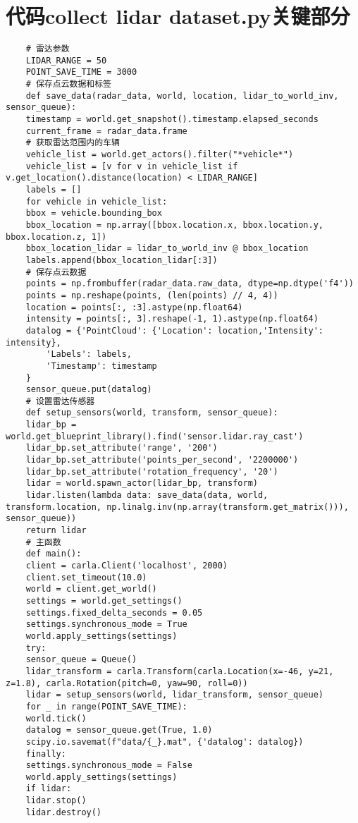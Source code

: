 \section{代码collect lidar dataset.py关键部分}


\begin{lstlisting}
	# 雷达参数
	LIDAR_RANGE = 50
	POINT_SAVE_TIME = 3000
	# 保存点云数据和标签
	def save_data(radar_data, world, location, lidar_to_world_inv, sensor_queue):
	timestamp = world.get_snapshot().timestamp.elapsed_seconds
	current_frame = radar_data.frame
	# 获取雷达范围内的车辆
	vehicle_list = world.get_actors().filter("*vehicle*")
	vehicle_list = [v for v in vehicle_list if v.get_location().distance(location) < LIDAR_RANGE]
	labels = []
	for vehicle in vehicle_list:
	bbox = vehicle.bounding_box
	bbox_location = np.array([bbox.location.x, bbox.location.y, bbox.location.z, 1])
	bbox_location_lidar = lidar_to_world_inv @ bbox_location
	labels.append(bbox_location_lidar[:3])
	# 保存点云数据
	points = np.frombuffer(radar_data.raw_data, dtype=np.dtype('f4'))
	points = np.reshape(points, (len(points) // 4, 4))
	location = points[:, :3].astype(np.float64)
	intensity = points[:, 3].reshape(-1, 1).astype(np.float64)
	datalog = {'PointCloud': {'Location': location,'Intensity': intensity},
		'Labels': labels,
		'Timestamp': timestamp
	}
	sensor_queue.put(datalog)
	# 设置雷达传感器
	def setup_sensors(world, transform, sensor_queue):
	lidar_bp = world.get_blueprint_library().find('sensor.lidar.ray_cast')
	lidar_bp.set_attribute('range', '200')
	lidar_bp.set_attribute('points_per_second', '2200000')
	lidar_bp.set_attribute('rotation_frequency', '20')
	lidar = world.spawn_actor(lidar_bp, transform)
	lidar.listen(lambda data: save_data(data, world, transform.location, np.linalg.inv(np.array(transform.get_matrix())), sensor_queue))
	return lidar
	# 主函数
	def main():
	client = carla.Client('localhost', 2000)
	client.set_timeout(10.0)
	world = client.get_world()
	settings = world.get_settings()
	settings.fixed_delta_seconds = 0.05
	settings.synchronous_mode = True
	world.apply_settings(settings)
	try:
	sensor_queue = Queue()
	lidar_transform = carla.Transform(carla.Location(x=-46, y=21, z=1.8), carla.Rotation(pitch=0, yaw=90, roll=0))
	lidar = setup_sensors(world, lidar_transform, sensor_queue)
	for _ in range(POINT_SAVE_TIME):
	world.tick()
	datalog = sensor_queue.get(True, 1.0)
	scipy.io.savemat(f"data/{_}.mat", {'datalog': datalog})
	finally:
	settings.synchronous_mode = False
	world.apply_settings(settings)
	if lidar:
	lidar.stop()
	lidar.destroy()
\end{lstlisting}


